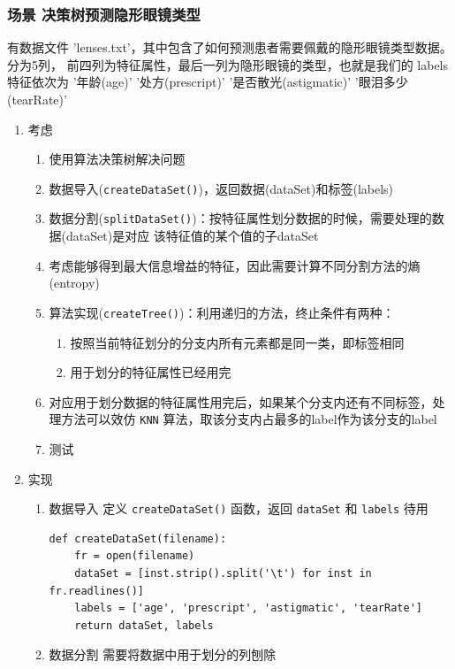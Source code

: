 \documentclass[11pt]{ctexart}
\begin{document}
\subsubsection{场景 决策树预测隐形眼镜类型}
\label{sec:orgheadline18}
有数据文件 'lenses.txt'，其中包含了如何预测患者需要佩戴的隐形眼镜类型数据。分为5列，
前四列为特征属性，最后一列为隐形眼镜的类型，也就是我们的 labels
特征依次为 '年龄(age)' '处方(prescript)' '是否散光(astigmatic)' '眼泪多少(tearRate)' 
\begin{enumerate}
\item 考虑
\label{sec:orgheadline16}
\begin{enumerate}
\item 使用算法决策树解决问题
\item 数据导入(\texttt{createDataSet()})，返回数据(dataSet)和标签(labels)
\item 数据分割(\texttt{splitDataSet()})：按特征属性划分数据的时候，需要处理的数据(dataSet)是对应
该特征值的某个值的子dataSet
\item 考虑能够得到最大信息增益的特征，因此需要计算不同分割方法的熵(entropy)
\item 算法实现(\texttt{createTree()})：利用递归的方法，终止条件有两种：
\begin{enumerate}
\item 按照当前特征划分的分支内所有元素都是同一类，即标签相同
\item 用于划分的特征属性已经用完
\end{enumerate}
\item 对应用于划分数据的特征属性用完后，如果某个分支内还有不同标签，处理方法可以效仿
\texttt{KNN} 算法，取该分支内占最多的label作为该分支的label
\item 测试
\end{enumerate}
\item 实现
\label{sec:orgheadline17}
\begin{enumerate}
\item 数据导入
定义 \texttt{createDataSet()} 函数，返回 \texttt{dataSet} 和 \texttt{labels} 待用
\lstset{language=Python,label= ,caption= ,captionpos=b,numbers=none}
\begin{lstlisting}
def createDataSet(filename):
    fr = open(filename)
    dataSet = [inst.strip().split('\t') for inst in fr.readlines()]
    labels = ['age', 'prescript', 'astigmatic', 'tearRate']
    return dataSet, labels
\end{lstlisting}
\item 数据分割
需要将数据中用于划分的列刨除
\lstset{language=Python,label= ,caption= ,captionpos=b,numbers=none}

\end{enumerate}
\end{enumerate}
\end{document}
